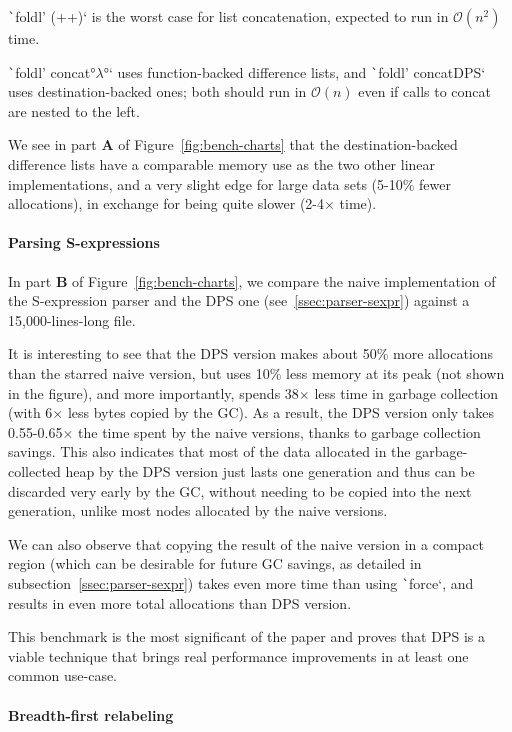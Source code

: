 \documentclass[english]{jflart}
\begin{document}
\texttt`foldl' (++)` is the worst case for list concatenation, expected to run in $\mathcal{O}(n^2)$ time.

\texttt`foldl' concat°$\lambda$°` uses function-backed difference lists, and \texttt`foldl' concatDPS` uses destin\-ation-backed ones; both should run in $\mathcal{O}(n)$ even if calls to concat are nested to the left.

We see in part \textbf{A} of Figure~\ref{fig:bench-charts} that the destination-backed difference lists have a comparable memory use as the two other linear implementations, and a very slight edge for large data sets (5-10\% fewer allocations), in exchange for being quite slower (2-4$\times$ time).

\paragraph{Parsing S-expressions}

In part \textbf{B} of Figure~\ref{fig:bench-charts}, we compare the naive implementation of the S-expression parser and the DPS one (see~\ref{ssec:parser-sexpr}) against a 15,000-lines-long file.

It is interesting to see that the DPS version makes about 50\% more allocations than the starred naive version, but uses 10\% less memory at its peak (not shown in the figure), and more importantly, spends 38$\times$ less time in garbage collection (with 6$\times$ less bytes copied by the GC). As a result, the DPS version only takes 0.55-0.65$\times$ the time spent by the naive versions, thanks to garbage collection savings. This also indicates that most of the data allocated in the garbage-collected heap by the DPS version just lasts one generation and thus can be discarded very early by the GC, without needing to be copied into the next generation, unlike most nodes allocated by the naive versions.

We can also observe that copying the result of the naive version in a compact region (which can be desirable for future GC savings, as detailed in subsection~\ref{ssec:parser-sexpr}) takes even more time than using \texttt`force`, and results in even more total allocations than DPS version.

This benchmark is the most significant of the paper and proves that DPS is a viable technique that brings real performance improvements in at least one common use-case.

\paragraph{Breadth-first relabeling}\label{par:benchmark-bf-tree-traversal}
\end{document}
